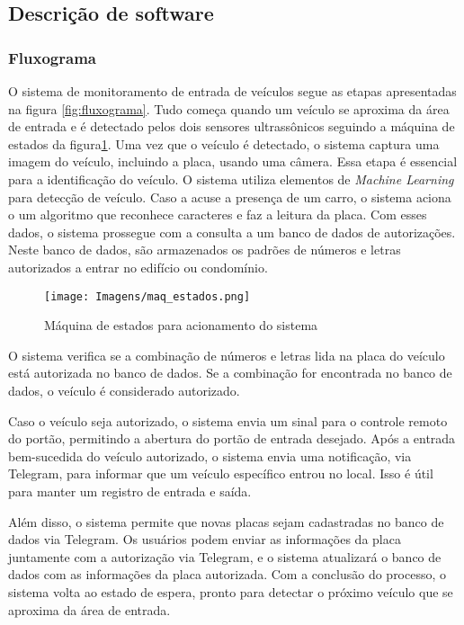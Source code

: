 \documentclass[conference]{IEEEtran}
\begin{document}
\subsection{Descrição de software}
\subsubsection{Fluxograma}

O sistema de monitoramento de entrada de veículos segue as etapas apresentadas na figura \ref{fig:fluxograma}. Tudo começa quando um veículo se aproxima da área de entrada e é detectado pelos dois sensores ultrassônicos seguindo a máquina de estados da figura\ref{fig:maqEstados}. Uma vez que o veículo é detectado, o sistema captura uma imagem do veículo, incluindo a placa, usando uma câmera. Essa etapa é essencial para a identificação do veículo.
O sistema utiliza elementos de \textit{Machine Learning} para detecção de veículo. Caso a acuse a presença de um carro, o sistema aciona o um algoritmo que reconhece caracteres e faz a leitura da placa. Com esses dados, o sistema prossegue com a consulta a um banco de dados de autorizações. Neste banco de dados, são armazenados os padrões de números e letras autorizados a entrar no edifício ou condomínio.

\begin{figure}
    \centering
    \texttt{[image: Imagens/maq\_estados.png]}
    \caption{Máquina de estados para acionamento do sistema}
    \label{fig:maqEstados}
\end{figure}

O sistema verifica se a combinação de números e letras lida na placa do veículo está autorizada no banco de dados. Se a combinação for encontrada no banco de dados, o veículo é considerado autorizado.

Caso o veículo seja autorizado, o sistema envia um sinal para o controle remoto do portão, permitindo a abertura do portão de entrada desejado. Após a entrada bem-sucedida do veículo autorizado, o sistema envia uma notificação, via Telegram, para informar que um veículo específico entrou no local. Isso é útil para manter um registro de entrada e saída.

Além disso, o sistema permite que novas placas sejam cadastradas no banco de dados via Telegram. Os usuários podem enviar as informações da placa juntamente com a autorização via Telegram, e o sistema atualizará o banco de dados com as informações da placa autorizada. Com a conclusão do processo, o sistema volta ao estado de espera, pronto para detectar o próximo veículo que se aproxima da área de entrada.
\end{document}
